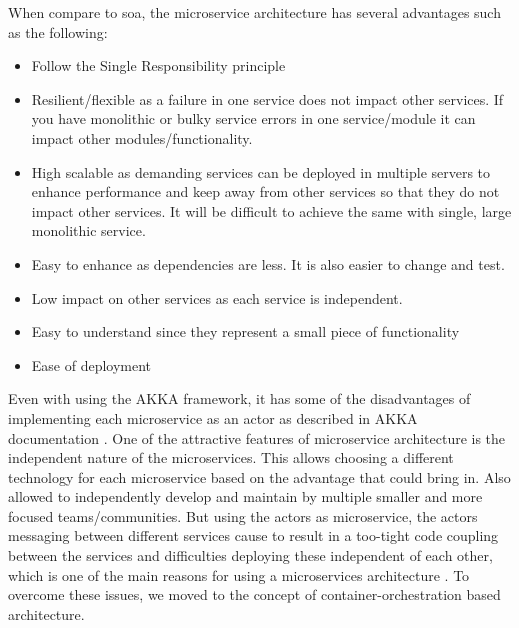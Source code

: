 When compare to \acrshort{soa}, the microservice architecture has several advantages such as the following:
\begin{itemize}
    \item Follow the Single Responsibility principle
    \item Resilient/flexible as a failure in one service does not impact other services. If you have monolithic or bulky service errors in one service/module it can impact other modules/functionality.
    \item High scalable as demanding services can be deployed in multiple servers to enhance performance and keep away from other services so that they do not impact other services. It will be difficult to achieve the same with single, large monolithic service.
    \item Easy to enhance as dependencies are less. It is also easier to change and test.
    \item Low impact on other services as each service is independent. %
    \item Easy to understand since they represent a small piece of functionality
    \item Ease of deployment
\end{itemize}


Even with using the AKKA framework, it has some of the disadvantages of implementing each microservice as an actor as described in AKKA documentation \cite{Akka.ioWhenCluster}. One of the attractive features of microservice architecture is the independent nature of the microservices. This allows choosing a different technology for each microservice based on the advantage that could bring in. Also allowed to independently develop and maintain by multiple smaller and more focused teams/communities. But using the actors as microservice, the actors messaging between different services cause to result in a too-tight code coupling between the services and difficulties deploying these independent of each other, which is one of the main reasons for using a microservices architecture \cite{Akka.ioWhenCluster}. To overcome these issues, we moved to the concept of container-orchestration based architecture.

